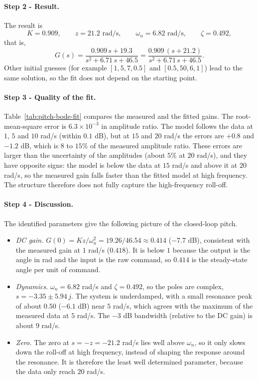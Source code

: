 \paragraph{Step 2 - Result.}
The result is
\begin{equation*}
K = 0.909, \qquad z = 21.2 \text{ rad/s}, \qquad \omega_n = 6.82 \text{ rad/s}, \qquad \zeta = 0.492 ,
\end{equation*}
that is,
\begin{equation*}
G(s) = \frac{0.909\, s + 19.3}{s^2 + 6.71\, s + 46.5} = \frac{0.909\,(s + 21.2)}{s^2 + 6.71\, s + 46.5} .
\end{equation*}
Other initial guesses (for example $[1, 5, 7, 0.5]$ and $[0.5, 50, 6, 1]$) lead to the same solution, so the fit does not depend on the starting point.

\paragraph{Step 3 - Quality of the fit.}
Table~\ref{tab:pitch-bode-fit} compares the measured and the fitted gains.
The root-mean-square error is $6.3 \times 10^{-3}$ in amplitude ratio.
The model follows the data at $1$, $5$ and $10$ rad/s (within $0.1$ dB), but at $15$ and $20$ rad/s the errors are $+0.8$ and $-1.2$ dB, which is $8$ to $15\%$ of the measured amplitude ratio.
These errors are larger than the uncertainty of the amplitudes (about $5\%$ at $20$ rad/s), and they have opposite signs: the model is below the data at $15$ rad/s and above it at $20$ rad/s, so the measured gain falls faster than the fitted model at high frequency.
The structure therefore does not fully capture the high-frequency roll-off.

\paragraph{Step 4 - Discussion.}
The identified parameters give the following picture of the closed-loop pitch.
\begin{itemize}
\item \emph{DC gain.} $G(0) = K z / \omega_n^2 = 19.26 / 46.54 \approx 0.414$ ($-7.7$ dB), consistent with the measured gain at $1$ rad/s ($0.418$).
It is below $1$ because the output is the angle in rad and the input is the raw command, so $0.414$ is the steady-state angle per unit of command.
\item \emph{Dynamics.} $\omega_n = 6.82$ rad/s and $\zeta = 0.492$, so the poles are complex, $s = -3.35 \pm 5.94\,j$.
The system is underdamped, with a small resonance peak of about $0.50$ ($-6.1$ dB) near $5$ rad/s, which agrees with the maximum of the measured data at $5$ rad/s.
The $-3$ dB bandwidth (relative to the DC gain) is about $9$ rad/s.
\item \emph{Zero.} The zero at $s = -z = -21.2$ rad/s lies well above $\omega_n$, so it only slows down the roll-off at high frequency, instead of shaping the response around the resonance.
It is therefore the least well determined parameter, because the data only reach $20$ rad/s.
\end{itemize}

